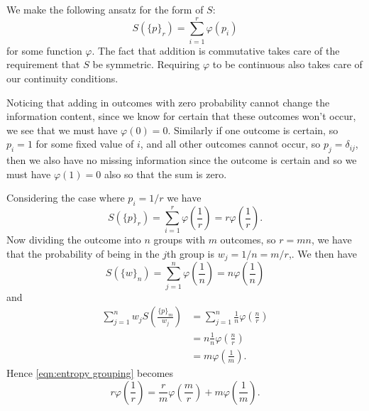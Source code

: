 \documentclass[fleqn]{NotesClass}
\begin{document}
    We make the following ansatz for the form of \(S\):
    \begin{equation}
        S(\{p\}_r) = \sum_{i=1}^{r} \varphi(p_i)
    \end{equation}
    for some function \(\varphi\).
    The fact that addition is commutative takes care of the requirement that \(S\) be symmetric.
    Requiring \(\varphi\) to be continuous also takes care of our continuity conditions.
    
    Noticing that adding in outcomes with zero probability cannot change the information content, since we know for certain that these outcomes won't occur, we see that we must have \(\varphi(0) = 0\).
    Similarly if one outcome is certain, so \(p_i = 1\) for some fixed value of \(i\), and all other outcomes cannot occur, so \(p_j = \delta_{ij}\), then we also have no missing information since the outcome is certain and so we must have \(\varphi(1) = 0\) also so that the sum is zero.
    
    Considering the case where \(p_i = 1/r\) we have
    \begin{equation}
        S(\{p\}_r) = \sum_{i=1}^{r} \varphi\left( \frac{1}{r} \right) = r\varphi\left( \frac{1}{r} \right).
    \end{equation}
    Now dividing the outcome into \(n\) groups with \(m\) outcomes, so \(r = mn\), we have that the probability of being in the \(j\)th group is \(w_j = 1/n = m/r\),.
    We then have
    \begin{equation}
        S(\{w\}_n) = \sum_{j=1}^{n} \varphi\left( \frac{1}{n} \right) = n\varphi\left( \frac{1}{n} \right)
    \end{equation}
    and
    \begin{align}
        \sum_{j=1}^{n} w_j S\left( \frac{\{p\}_m}{w_j} \right) &= \sum_{j=1}^{n} \frac{1}{n} \varphi\left( \frac{n}{r} \right)\\
         &= n \frac{1}{n}\varphi\left( \frac{n}{r} \right)\\
         &= m\varphi\left( \frac{1}{m} \right).
    \end{align}
    Hence \cref{eqn:entropy grouping} becomes
    \begin{equation}
        r\varphi\left( \frac{1}{r} \right) = \frac{r}{m} \varphi\left( \frac{m}{r} \right) + m \varphi\left( \frac{1}{m} \right).
    \end{equation}
    
\end{document}
